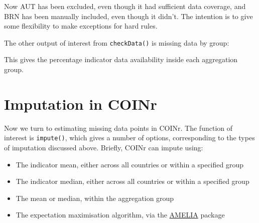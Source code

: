 \documentclass[
]{book}
\newenvironment{Shaded}{\begin{snugshade}}{\end{snugshade}}
\newcommand{\CommentTok}[1]{\textcolor[rgb]{0.56,0.35,0.01}{\textit{#1}}}
\newcommand{\DecValTok}[1]{\textcolor[rgb]{0.00,0.00,0.81}{#1}}
\newcommand{\KeywordTok}[1]{\textcolor[rgb]{0.13,0.29,0.53}{\textbf{#1}}}
\newcommand{\NormalTok}[1]{#1}
\newcommand{\OperatorTok}[1]{\textcolor[rgb]{0.81,0.36,0.00}{\textbf{#1}}}
\providecommand{\tightlist}{%
  \setlength{\itemsep}{0pt}\setlength{\parskip}{0pt}}
\begin{document}
Now AUT has been excluded, even though it had sufficient data coverage, and BRN has been manually included, even though it didn't. The intention is to give some flexibility to make exceptions for hard rules.

The other output of interest from \texttt{checkData()} is missing data by group:

\begin{Shaded}
\end{Shaded}

This gives the percentage indicator data availability inside each aggregation group.

\hypertarget{imputation-in-coinr}{%
\section{Imputation in COINr}\label{imputation-in-coinr}}

Now we turn to estimating missing data points in COINr. The function of interest is \texttt{impute()}, which gives a number of options, corresponding to the types of imputation discussed above. Briefly, COINr can impute using:

\begin{itemize}
\tightlist
\item
  The indicator mean, either across all countries or within a specified group
\item
  The indicator median, either across all countries or within a specified group
\item
  The mean or median, within the aggregation group
\item
  The expectation maximisation algorithm, via the \href{https://cran.r-project.org/web/packages/Amelia/index.html}{AMELIA} package
\end{itemize}
\end{document}
